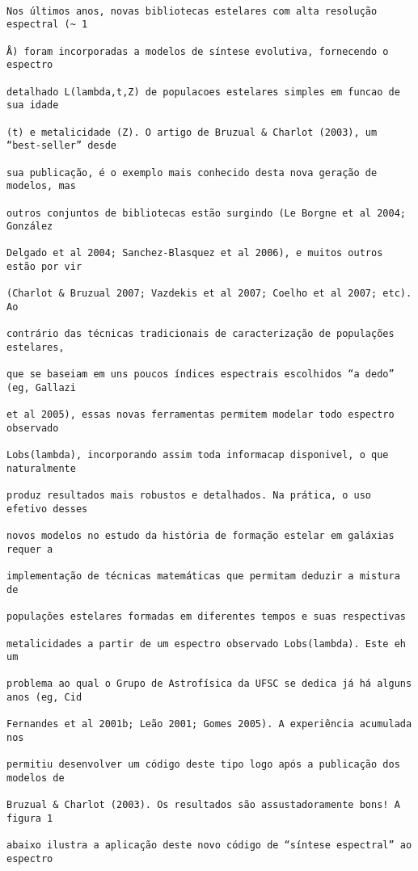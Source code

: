\begin{verbatim}

Nos últimos anos, novas bibliotecas estelares com alta resolução espectral (~ 1

Å) foram incorporadas a modelos de síntese evolutiva, fornecendo o espectro

detalhado L(lambda,t,Z) de populacoes estelares simples em funcao de sua idade

(t) e metalicidade (Z). O artigo de Bruzual & Charlot (2003), um “best-seller” desde

sua publicação, é o exemplo mais conhecido desta nova geração de modelos, mas

outros conjuntos de bibliotecas estão surgindo (Le Borgne et al 2004; González

Delgado et al 2004; Sanchez-Blasquez et al 2006), e muitos outros estão por vir

(Charlot & Bruzual 2007; Vazdekis et al 2007; Coelho et al 2007; etc). Ao

contrário das técnicas tradicionais de caracterização de populações estelares,

que se baseiam em uns poucos índices espectrais escolhidos “a dedo” (eg, Gallazi

et al 2005), essas novas ferramentas permitem modelar todo espectro observado

Lobs(lambda), incorporando assim toda informacap disponivel, o que naturalmente

produz resultados mais robustos e detalhados. Na prática, o uso efetivo desses

novos modelos no estudo da história de formação estelar em galáxias requer a

implementação de técnicas matemáticas que permitam deduzir a mistura de

populações estelares formadas em diferentes tempos e suas respectivas

metalicidades a partir de um espectro observado Lobs(lambda). Este eh um

problema ao qual o Grupo de Astrofísica da UFSC se dedica já há alguns anos (eg, Cid

Fernandes et al 2001b; Leão 2001; Gomes 2005). A experiência acumulada nos

permitiu desenvolver um código deste tipo logo após a publicação dos modelos de

Bruzual & Charlot (2003). Os resultados são assustadoramente bons! A figura 1

abaixo ilustra a aplicação deste novo código de “síntese espectral” ao espectro


\end{verbatim}
